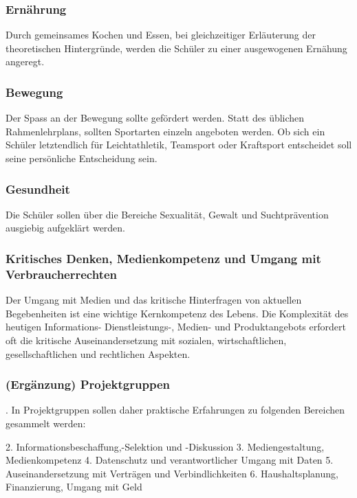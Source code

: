\subsubsection{Ernährung}
\abstimmung
Durch gemeinsames Kochen und Essen, bei gleichzeitiger Erläuterung der theoretischen Hintergründe, werden die Schüler zu einer ausgewogenen Ernähung angeregt.

\subsubsection{Bewegung}
\abstimmung
Der Spass an der Bewegung sollte gefördert werden. Statt des üblichen Rahmenlehrplans, sollten Sportarten einzeln angeboten werden. Ob sich ein Schüler letztendlich für Leichtathletik, Teamsport oder Kraftsport entscheidet soll seine persönliche Entscheidung sein.

\subsubsection{Gesundheit}
\abstimmung
Die Schüler sollen über die Bereiche Sexualität, Gewalt und Suchtprävention ausgiebig aufgeklärt werden.
 

\subsubsection{Kritisches Denken, Medienkompetenz und Umgang mit Verbraucherrechten}
\abstimmung
Der Umgang mit Medien und das kritische Hinterfragen von aktuellen Begebenheiten ist eine wichtige Kernkompetenz des Lebens. Die Komplexität des heutigen Informations- Dienstleistungs-, Medien- und Produktangebots erfordert oft die kritische Auseinandersetzung mit sozialen, wirtschaftlichen, gesellschaftlichen und rechtlichen Aspekten.

\subsubsection{(Ergänzung) Projektgruppen}
. In Projektgruppen sollen daher praktische Erfahrungen zu folgenden Bereichen gesammelt werden:

2. Informationsbeschaffung,-Selektion und -Diskussion 3. Mediengestaltung, Medienkompetenz 4. Datenschutz und verantwortlicher Umgang mit Daten 5. Auseinandersetzung mit Verträgen und Verbindlichkeiten 6. Haushaltsplanung, Finanzierung, Umgang mit Geld


